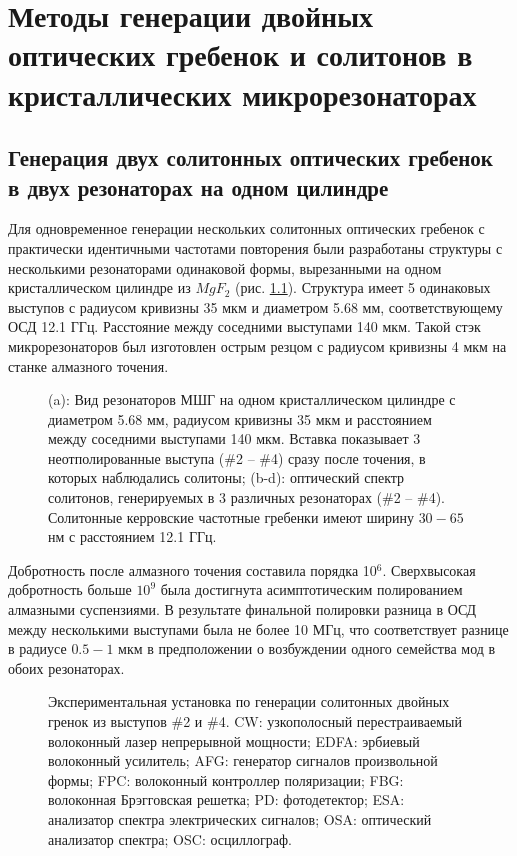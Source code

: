 \chapter{Методы генерации двойных оптических гребенок и солитонов в кристаллических микрорезонаторах} \label{chapt4}

\section{Генерация двух солитонных оптических гребенок в двух резонаторах на одном цилиндре}

Для одновременное генерации нескольких солитонных оптических гребенок \cite{Pavlov2017} с практически идентичными частотами повторения были разработаны структуры с несколькими резонаторами одинаковой формы, вырезанными на одном кристаллическом цилиндре из $MgF_2$ (рис. \ref{ris:image1}). Структура имеет 5 одинаковых выступов с радиусом кривизны 35 мкм и диаметром 5.68 мм, соответствующему ОСД 12.1 ГГц. Расстояние между соседними выступами 140 мкм. Такой стэк микрорезонаторов был изготовлен острым резцом с радиусом кривизны 4 мкм на станке алмазного точения.

\begin{figure}[ht]
\begin{minipage}[ht]{1\linewidth}
\end{minipage}
\caption{ (a): Вид резонаторов МШГ на одном кристаллическом цилиндре с диаметром 5.68 мм, радиусом кривизны 35 мкм и расстоянием между соседними выступами 140 мкм. Вставка показывает 3 неотполированные выступа (\#2 -- \#4) сразу после точения, в которых наблюдались солитоны; (b-d): оптический спектр солитонов, генерируемых в 3 различных резонаторах (\#2 -- \#4). Солитонные керровские частотные гребенки имеют ширину $30 - 65$ нм с расстоянием 12.1 ГГц.}
\label{ris:image1}
\end{figure}

Добротность после алмазного точения составила порядка 10$^6$. Сверхвысокая добротность больше $10^9$ была достигнута асимптотическим полированием алмазными суспензиями. В результате финальной полировки разница в ОСД между несколькими выступами была не более 10 МГц, что соответствует разнице в радиусе $0.5 - 1$ мкм в предположении о возбуждении одного семейства мод в обоих резонаторах.

\begin{figure}[ht]
\begin{minipage}[ht]{1\linewidth}
\end{minipage}
\caption{Экспериментальная установка по генерации солитонных двойных гренок из выступов \#2 и \#4. CW: узкополосный перестраиваемый волоконный лазер непрерывной мощности; EDFA: эрбиевый волоконный усилитель; AFG: генератор сигналов произвольной формы; FPC:  волоконный контроллер поляризации; FBG: волоконная Брэгговская решетка; PD: фотодетектор; ESA: анализатор спектра электрических сигналов; OSA: оптический анализатор спектра; OSC: осциллограф.}
\label{ris:image2}
\end{figure}

